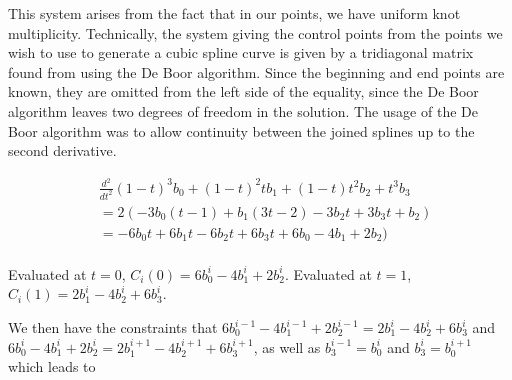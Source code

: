 \documentclass[12pt]{article}
\begin{document}
This system arises from the fact that in our points, we have uniform knot multiplicity. 
Technically, the system giving the control points from the points we wish to use to 
generate a cubic spline curve is given by a tridiagonal matrix found from using the 
De Boor algorithm. Since the beginning and end points are known, they are omitted from 
the left side of the equality, since the De Boor algorithm leaves two degrees of freedom in the solution.
The usage of the De Boor algorithm was to allow continuity between the joined splines up to the second derivative.

\begin{align*}
&\frac{d^2}{dt^2} (1-t)^3 b_0 + (1-t)^2 t b_1 + (1-t)t^2 b_2 + t^3 b_3\\
&= 2(-3 b_0(t-1) + b_1(3t - 2) - 3 b_2 t + 3 b_3 t + b_2)\\
&= -6 b_0 t + 6 b_1 t - 6 b_2 t + 6 b_3 t + 6 b_0 - 4 b_1 + 2 b_2)\\
\end{align*}

Evaluated at $t=0$,
$C_i(0) = 6 b_0^i - 4 b_1^i + 2 b_2^i$.
Evaluated at $t=1$,
$C_i(1) = 2 b_1^i - 4 b_2^i + 6 b_3^i$.

We then have the constraints that 
$6 b_0^{i-1} - 4 b_1^{i-1} + 2 b_2^{i-1} = 2 b_1^i - 4 b_2^i + 6 b_3^i$ and
$6 b_0^{i} - 4 b_1^{i} + 2 b_2^{i} = 2 b_1^{i+1} - 4 b_2^{i+1} + 6 b_3^{i+1}$,
as well as $b_3^{i-1} = b_0^i$ and $b_3^i = b_0^{i+1}$
which leads to 
\end{document}
